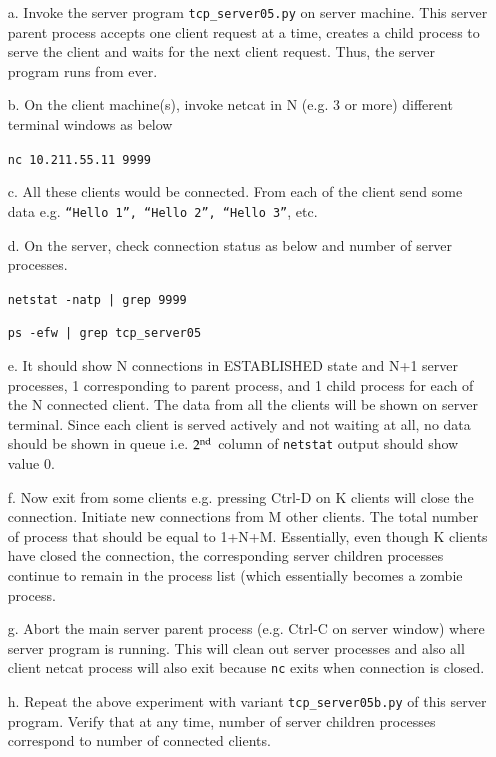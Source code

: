 \begin{multicols}{2}
\begin{itemize}
\item[a.] Invoke the server program \texttt{tcp\_server05.py} on server machine. This server parent process accepts one client request at a time, creates a child process to serve the client and waits for the next client request. Thus, the server program runs from ever.

\item[b.] On the client machine(s), invoke netcat in N (e.g. 3 or more) different terminal windows as below

\texttt{nc 10.211.55.11 9999}

\item[c.] All these clients would be connected. From each of the client send some data e.g. \texttt{“Hello 1”, “Hello 2”, “Hello 3”}, etc.

 \item[d.] On the server, check connection status as below and number of server processes.
 
 \texttt{netstat -natp | grep 9999}
 
 \texttt{ps -efw | grep tcp\_server05}
 
\item[e.] It should show N connections in ESTABLISHED state and N+1 server processes, 1 corresponding to parent process, and 1 child process for each of the N connected client. The data from all the clients will be shown on server terminal. Since each client is served actively and not waiting at all, no data should be shown in queue i.e. $2^{\rm nd}$ column of \texttt{netstat} output should show value 0.

\item[f.] Now exit from some clients e.g. pressing Ctrl-D on K clients will close the connection.  Initiate new connections from M other clients. The total number of process that should be equal to 1+N+M. Essentially, even though K clients have closed the connection, the corresponding server children processes continue to remain in the process list (which essentially becomes a zombie process.

\item[g.] Abort the main server parent process (e.g. Ctrl-C on server window) where server program is running. This will clean out server processes and also all client netcat process will also exit because \texttt{nc} exits when connection is closed.

\item[h.] Repeat the above experiment with variant \texttt{tcp\_server05b.py} of this server program. Verify that at any time, number of server children processes correspond to number of connected clients.


\end{itemize}
\end{multicols}
